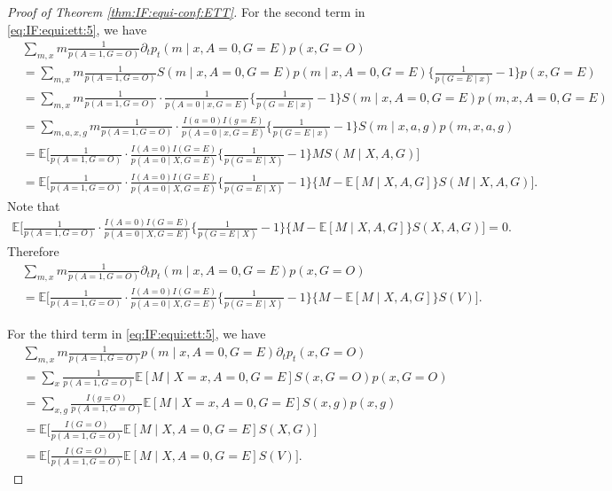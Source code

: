 \documentclass[10pt]{article}
\newcommand{\E}{\mathbb{E}}
\begin{document}
\begin{proof}[Proof of Theorem \ref{thm:IF:equi-conf:ETT}]
For the second term in \eqref{eq:IF:equi:ett:5}, we have
{\footnotesize \begin{align*}
&\sum_{m,x} m \frac{1}{p(A=1,G=O)}\partial_t p_t(m\mid x,A=0,G=E)p(x,G=O)\\
&=\sum_{m,x} m \frac{1}{p(A=1,G=O)} S(m\mid x,A=0,G=E)p(m\mid x,A=0,G=E)\{\frac{1}{p(G=E\mid x)}-1\}p(x,G=E)\\
&=\sum_{m,x} m \frac{1}{p(A=1,G=O)}\cdot\frac{1}{p(A=0\mid x,G=E)}\{\frac{1}{p(G=E\mid x)}-1\} S(m\mid x,A=0,G=E)p(m,x,A=0,G=E)\\
&=\sum_{m,a,x,g} m \frac{1}{p(A=1,G=O)}\cdot\frac{I(a=0)I(g=E)}{p(A=0\mid x,G=E)}\{\frac{1}{p(G=E\mid x)}-1\} S(m\mid x,a,g)p(m,x,a,g)\\
&=\E\Big[\frac{1}{p(A=1,G=O)}\cdot\frac{I(A=0)I(G=E)}{p(A=0\mid X,G=E)}\{\frac{1}{p(G=E\mid X)}-1\}M S(M\mid X,A,G) \Big]\\
&=\E\Big[\frac{1}{p(A=1,G=O)}\cdot\frac{I(A=0)I(G=E)}{p(A=0\mid X,G=E)}\{\frac{1}{p(G=E\mid X)}-1\}\{M-\E[M\mid X,A,G]\} S(M\mid X,A,G) \Big].
\end{align*}}
Note that
{\footnotesize \begin{align*}
\E\Big[\frac{1}{p(A=1,G=O)}\cdot\frac{I(A=0)I(G=E)}{p(A=0\mid X,G=E)}\{\frac{1}{p(G=E\mid X)}-1\}\{M-\E[M\mid X,A,G]\} S(X,A,G) \Big]=0.	
\end{align*}}
Therefore
\begin{equation}
\label{eq:IF:equi:ett:7}
\begin{aligned}
&\sum_{m,x} m \frac{1}{p(A=1,G=O)}\partial_t p_t(m\mid x,A=0,G=E)p(x,G=O)\\
&=\E\Big[\frac{1}{p(A=1,G=O)}\cdot\frac{I(A=0)I(G=E)}{p(A=0\mid X,G=E)}\{\frac{1}{p(G=E\mid X)}-1\}\{M-\E[M\mid X,A,G]\} S(V) \Big].
\end{aligned}
\end{equation}

For the third term in \eqref{eq:IF:equi:ett:5}, we have
\begin{equation}
\label{eq:IF:equi:ett:8}
\begin{aligned}
&\sum_{m,x} m \frac{1}{p(A=1,G=O)}p(m\mid x,A=0,G=E)\partial_t p_t(x,G=O)\\
&=\sum_{x}\frac{1}{p(A=1,G=O)}\E[M\mid X=x,A=0,G=E] S(x,G=O)p(x,G=O)\\
&=\sum_{x,g}\frac{I(g=O)}{p(A=1,G=O)}\E[M\mid X=x,A=0,G=E] S(x,g)p(x,g)\\
&=\E\Big[\frac{I(G=O)}{p(A=1,G=O)}\E[M\mid X,A=0,G=E] S(X,G)\Big]\\
&=\E\Big[\frac{I(G=O)}{p(A=1,G=O)}\E[M\mid X,A=0,G=E] S(V)\Big].
\end{aligned}
\end{equation}


\end{proof}
\end{document}
